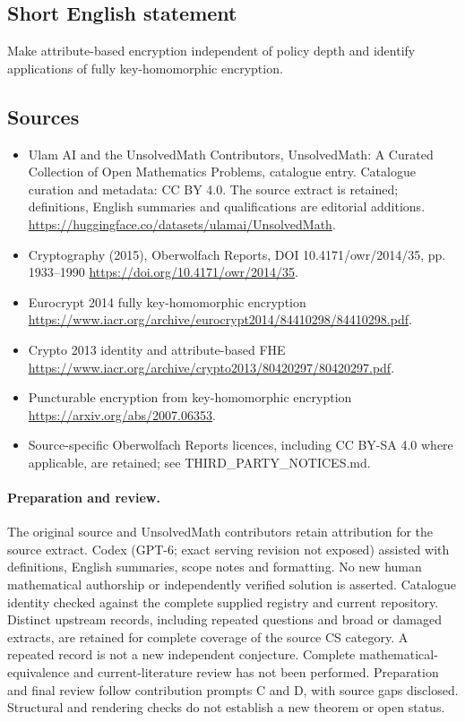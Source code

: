 \documentclass[11pt]{article}
\begin{document}
\subsection{Short English statement}
Make attribute-based encryption independent of policy depth and identify applications of fully key-homomorphic encryption.
\subsection{Sources}
\begin{itemize}
\item[\hypertarget{source:statement:1}{S1}] Ulam AI and the UnsolvedMath Contributors, UnsolvedMath: A Curated Collection of Open Mathematics Problems, catalogue entry. Catalogue curation and metadata: CC BY 4.0. The source extract is retained; definitions, English summaries and qualifications are editorial additions.
\url{https://huggingface.co/datasets/ulamai/UnsolvedMath}.
\item[\hypertarget{source:statement:2}{S2}] Cryptography (2015), Oberwolfach Reports, DOI 10.4171/owr/2014/35, pp. 1933--1990
\url{https://doi.org/10.4171/owr/2014/35}.
\item[\hypertarget{source:statement:3}{S3}] Eurocrypt 2014 fully key-homomorphic encryption
\url{https://www.iacr.org/archive/eurocrypt2014/84410298/84410298.pdf}.
\item[\hypertarget{source:statement:4}{S4}] Crypto 2013 identity and attribute-based FHE
\url{https://www.iacr.org/archive/crypto2013/80420297/80420297.pdf}.
\item[\hypertarget{source:statement:5}{S5}] Puncturable encryption from key-homomorphic encryption
\url{https://arxiv.org/abs/2007.06353}.
\item Source-specific Oberwolfach Reports licences, including CC BY-SA 4.0 where applicable, are retained; see THIRD\_PARTY\_NOTICES.md.
\end{itemize}
\paragraph{Preparation and review.}
The original source and UnsolvedMath contributors retain attribution for the source extract. Codex (GPT-6; exact serving revision not exposed) assisted with definitions, English summaries, scope notes and formatting. No new human mathematical authorship or independently verified solution is asserted. Catalogue identity checked against the complete supplied registry and current repository. Distinct upstream records, including repeated questions and broad or damaged extracts, are retained for complete coverage of the source CS category. A repeated record is not a new independent conjecture. Complete mathematical-equivalence and current-literature review has not been performed. Preparation and final review follow contribution prompts C and D, with source gaps disclosed. Structural and rendering checks do not establish a new theorem or open status.
\label{end:statement}
\end{document}
